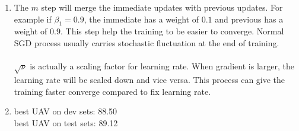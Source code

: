\documentclass[10pt]{article}
\begin{document}
\begin{enumerate}[label=(\alph*)]
\item
The $m$ step will merge the immediate updates with previous updates.
For example if $\beta_1 = 0.9$, the immediate has a weight of $0.1$ and previous has a weight of $0.9$.
This step help the training to be easier to converge.
Normal SGD process usually carries stochastic fluctuation at the end of training.\\
\\
$\sqrt{\nu}$ is actually a scaling factor for learning rate.
When gradient is larger, the learning rate will be scaled down and vice versa.
This process can give the training faster converge compared to fix learning rate.

\item
best UAV on dev sets: 88.50\\
best UAV on test sets: 89.12\\
\end{enumerate}


\pagebreak[4]
\end{document}
